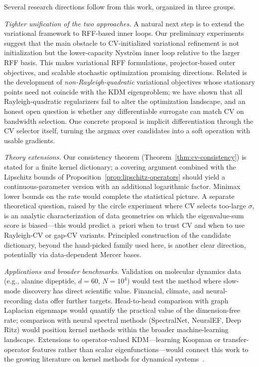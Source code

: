 \documentclass[11pt]{article}
\theoremstyle{remark}
\begin{document}
Several research directions follow from this work, organized in three groups.

\emph{Tighter unification of the two approaches.} A natural next step is to extend the variational framework to RFF-based inner loops. Our preliminary experiments suggest that the main obstacle to CV-initialized variational refinement is not initialization but the lower-capacity Nystr\"om inner loop relative to the larger RFF basis. This makes variational RFF formulations, projector-based outer objectives, and scalable stochastic optimization promising directions. Related is the development of \emph{non-Rayleigh-quadratic} variational objectives whose stationary points need not coincide with the KDM eigenproblem; we have shown that all Rayleigh-quadratic regularizers fail to alter the optimization landscape, and an honest open question is whether any differentiable surrogate can match CV on bandwidth selection. One concrete proposal is implicit differentiation through the CV selector itself, turning the argmax over candidates into a soft operation with usable gradients.

\emph{Theory extensions.} Our consistency theorem (Theorem~\ref{thm:cv-consistency}) is stated for a finite kernel dictionary; a covering argument combined with the Lipschitz bounds of Proposition~\ref{prop:lipschitz-operators} should yield a continuous-parameter version with an additional logarithmic factor. Minimax lower bounds on the rate would complete the statistical picture. A separate theoretical question, raised by the circle experiment where CV selects too-large $\sigma$, is an analytic characterization of data geometries on which the eigenvalue-sum score is biased---this would predict a~priori when to trust CV and when to use Rayleigh-CV or gap-CV variants. Principled construction of the candidate dictionary, beyond the hand-picked family used here, is another clear direction, potentially via data-dependent Mercer bases.

\emph{Applications and broader benchmarks.} Validation on molecular dynamics data (e.g., alanine dipeptide, $d\!=\!60$, $N\!=\!10^4$) would test the method where slow-mode discovery has direct scientific value. Financial, climate, and neural-recording data offer further targets. Head-to-head comparison with graph Laplacian eigenmaps would quantify the practical value of the dimension-free rate; comparison with neural spectral methods (SpectralNet, NeuralEF, Deep Ritz) would position kernel methods within the broader machine-learning landscape. Extensions to operator-valued KDM---learning Koopman or transfer-operator features rather than scalar eigenfunctions---would connect this work to the growing literature on kernel methods for dynamical systems~\citep{klus2020kernel,lee2024kernel}.
\end{document}
